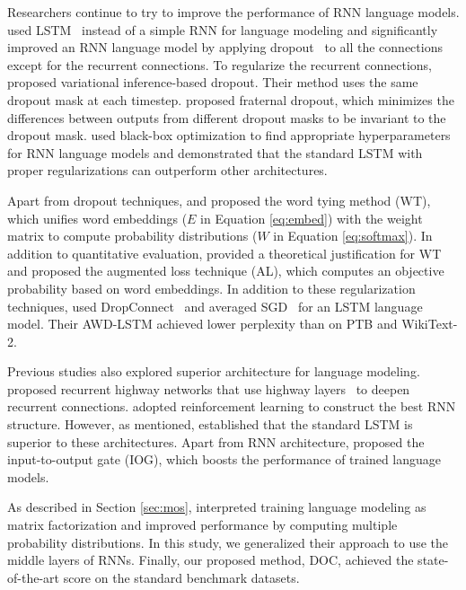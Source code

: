 \documentclass[11pt,a4paper]{article}
\begin{document}
Researchers continue to try to improve the performance of RNN language models.
 used LSTM~\cite{Hochreiter:1997:LSM:1246443.1246450} instead of a simple RNN for language modeling and significantly improved an RNN language model by applying dropout~\cite{Srivastava:2014:DSW:2627435.2670313} to all the connections except for the recurrent connections.
To regularize the recurrent connections,  proposed variational inference-based dropout.
Their method uses the same dropout mask at each timestep.
 proposed fraternal dropout, which minimizes the differences between outputs from different dropout masks to be invariant to the dropout mask.
 used black-box optimization to find appropriate hyperparameters for RNN language models and demonstrated that the standard LSTM with proper regularizations can outperform other architectures.



Apart from dropout techniques,  and  proposed the word tying method (WT), which unifies word embeddings ($E$ in Equation \ref{eq:embed}) with the weight matrix to compute probability distributions ($W$ in Equation \ref{eq:softmax}).
In addition to quantitative evaluation,  provided a theoretical justification for WT and proposed the augmented loss technique (AL), which computes an objective probability based on word embeddings.
In addition to these regularization techniques,  used DropConnect~\cite{wan2013regularization} and averaged SGD~\cite{polyak1992acceleration} for an LSTM language model.
Their AWD-LSTM achieved lower perplexity than  on PTB and WikiText-2.


Previous studies also explored superior architecture for language modeling.
 proposed recurrent highway networks that use highway layers~\cite{DBLP:journals/corr/SrivastavaGS15} to deepen recurrent connections.
 adopted reinforcement learning to construct the best RNN structure.
However, as mentioned,  established that the standard LSTM is superior to these architectures.
Apart from RNN architecture,  proposed the input-to-output gate (IOG), which boosts the performance of trained language models.


As described in Section \ref{sec:mos},  interpreted training language modeling as matrix factorization and improved performance by computing multiple probability distributions.
In this study, we generalized their approach to use the middle layers of RNNs.
Finally, our proposed method, DOC, achieved the state-of-the-art score on the standard benchmark datasets.
\end{document}
